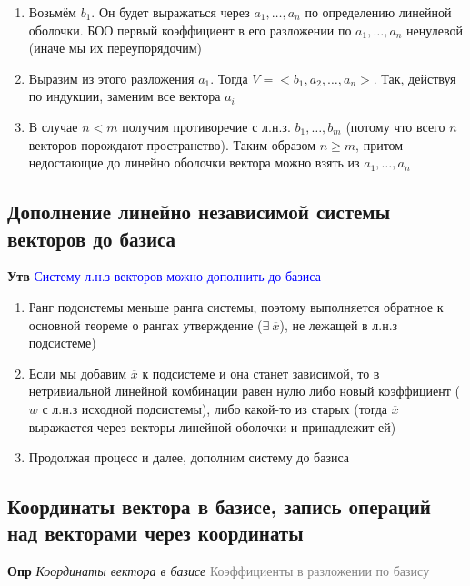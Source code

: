\documentclass[a4paper, 14pt]{article}
\begin{document}
    \begin{enumerate}
        \item Возьмём $b_1$.
        Он будет выражаться через $a_1, \dots, a_n$ по определению линейной оболочки.
        БОО первый коэффициент в его разложении по $a_1, \dots, a_n$ ненулевой (иначе мы их переупорядочим)
        \item Выразим из этого разложения $a_1$.
        Тогда $V = <b_1, a_2, \dots, a_n>$.
        Так, действуя по индукции, заменим все вектора $a_i$
        \item В случае $n < m$ получим противоречие с л.н.з. $b_1, \dots, b_m$ (потому что всего $n$ векторов
        порождают пространство).
        Таким образом $n \geq m$, притом недостающие до линейно оболочки вектора можно взять из $a_1, \dots, a_n$
    \end{enumerate}

    \subsection{Дополнение линейно независимой системы векторов до базиса}

    \textbf{Утв} \textcolor{blue}{Систему л.н.з векторов можно дополнить до базиса}

    \begin{enumerate}
        \item Ранг подсистемы меньше ранга системы, поэтому выполняется обратное к основной теореме о рангах
        утверждение ($\exists~\overline{x}$), не лежащей в л.н.з подсистеме)
        \item Если мы добавим $\overline{x}$ к подсистеме и она станет зависимой, то в нетривиальной линейной комбинации равен
        нулю либо новый коэффициент ($w$ с л.н.з исходной подсистемы), либо какой-то из старых (тогда $\overline{x}$
        выражается через векторы линейной оболочки и принадлежит ей)
        \item Продолжая процесс и далее, дополним систему до базиса
    \end{enumerate}

    \subsection{Координаты вектора в базисе, запись операций над векторами через координаты}

    \textbf{Опр} \textit{Координаты вектора в базисе} \textcolor{gray}{Коэффициенты в разложении по базису}
\end{document}
